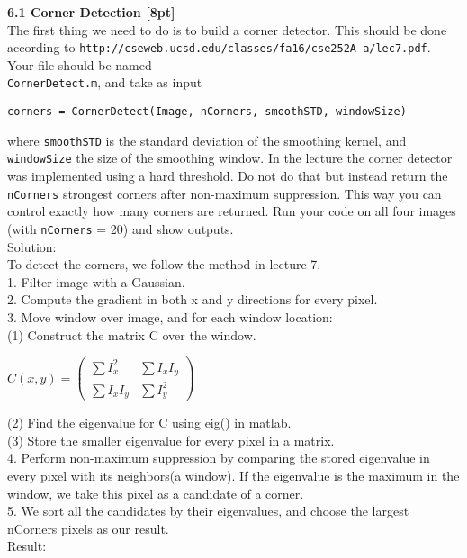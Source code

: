 \documentclass{assignment}
\begin{document}
\begin{problemlist}
\textbf{6.1 Corner Detection [8pt]}\\
The first thing we need to do is to build a corner detector. This should be done according to \texttt{http://cseweb.ucsd.edu/classes/fa16/cse252A-a/lec7.pdf}. Your file should be named\\
\texttt{CornerDetect.m}, and take as input\\
\begin{lstlisting}
corners = CornerDetect(Image, nCorners, smoothSTD, windowSize)
\end{lstlisting}
where \texttt{smoothSTD} is the standard deviation of the smoothing kernel, and \texttt{windowSize} the size of the smoothing window. In the lecture the corner detector was implemented using a hard threshold. Do not do that but instead return the \texttt{nCorners} strongest corners after non-maximum suppression. This way you can control exactly how many corners are returned. Run your code on all four images (with \texttt{nCorners} = 20) and show outputs.\\
Solution:\\
To detect the corners, we follow the method in lecture 7.\\
1. Filter image with a Gaussian.\\
2. Compute the gradient in both x and y directions for every pixel.\\
3. Move window over image, and for each window location: \\
(1) Construct the matrix C over the window.\\
\begin{center}
$
C(x, y) =
\left(
\begin{array}{clr}
\sum{}I_x^2 & \sum{}I_xI_y\\
\sum{}I_xI_y & \sum{}I_y^2
\end{array}
\right)
$
\end{center}
(2) Find the eigenvalue for C using eig() in matlab.\\
(3) Store the smaller eigenvalue for every pixel in a matrix.\\
4. Perform non-maximum suppression by comparing the stored eigenvalue in every pixel with its neighbors(a window). If the eigenvalue is the maximum in the window, we take this pixel as a candidate of a corner.\\
5. We sort all the candidates by their eigenvalues, and choose the largest nCorners pixels as our result.\\
Result:\\






\end{problemlist}
\end{document}
